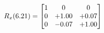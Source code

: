 \documentclass[preview]{standalone}
\begin{document}
\begin{align*}
\special{dvisvgm:raw <g id='unique000'>}R_{x}(6.21) = \begin{bmatrix}1 & 0 & 0 \\0 & +1.00 & +0.07 \\0 & -0.07 & +1.00\end{bmatrix}\special{dvisvgm:raw </g>}
\end{align*}
\end{document}
